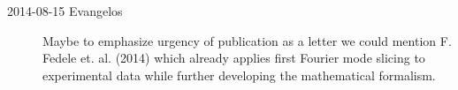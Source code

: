 \begin{description}

%

\item[2014-08-15 Evangelos]
Maybe to emphasize urgency of publication as a letter
we could mention F. Fedele et. al. (2014) 
which already applies first Fourier mode slicing to experimental data while
further developing the mathematical formalism.


\end{description}
